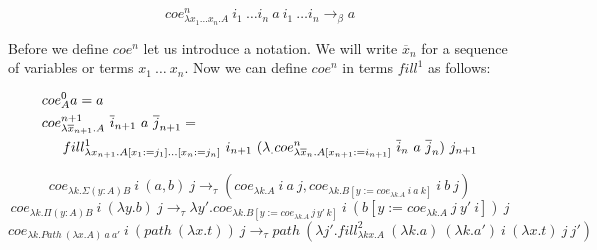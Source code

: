 \documentclass{amsart}
\theoremstyle{definition}
\theoremstyle{remark}
\numberwithin{figure}{section}
\begin{document}
\[ coe^n_{\lambda x_1 \ldots x_n. A}\ i_1\ \ldots i_n\ a\ i_1\ \ldots i_n \to_\beta a \]

Before we define $coe^n$ let us introduce a notation.
We will write $\overline{x}_n$ for a sequence of variables or terms $x_1\ \ldots\ x_n$.
Now we can define $coe^n$ in terms $fill^1$ as follows:

\begin{align*}
& coe^0_A a = a \\
& coe^{n+1}_{\lambda \overline{x}_{n+1}. A}\ \overline{i}_{n+1}\ a\ \overline{j}_{n+1} = \\
& \indent fill^1_{\lambda x_{n+1}. A[x_1 := j_1] \ldots [x_n := j_n]}\ i_{n+1}\ (\lambda _. coe^n_{\lambda \overline{x}_n. A[x_{n+1} := i_{n+1}]}\ \overline{i}_n\ a\ \overline{j}_n)\ j_{n+1}
\end{align*}

\begin{comment}
\begin{align*}
& fill^1_{\lambda x_1. A}\ i\ a_1\ j_1 = coe_{\lambda x_1. A}\ i\ a_1\ j_1 \\
& fill^{n+1}_{\lambda \overline{x}_{n+1}. A}\ (\lambda \overline{x}_n. a_{n+1})\ (\lambda \overline{x}_n. a'_{n+1}) \ldots (\lambda \overline{x}_n. a_2)\ (\lambda \overline{x}_n. a'_2)\ i\ (\lambda \overline{x}_n. a_1)\ j_1 \ldots j_{n+1} = \\
& \indent fill^n_{\lambda \overline{x}_n. Path\ (\lambda x_{n+1}. A)\ a_{n+1}\ a'_{n+1}} \\
& \indent (\lambda \overline{x}_{n-1}. path (\lambda x_n. a_n))\ (\lambda \overline{x}_{n-1}. path (\lambda x_n. a'_n)) \ldots \\
& \indent (\lambda \overline{x}_{n-1}. path (\lambda x_n. a_2))\ (\lambda \overline{x}_{n-1}. path (\lambda x_n. a'_2)) \\
& \indent i\ (\lambda \overline{x}_{n-1}. path (\lambda x_n. a_1))\ j_1 \ldots j_n\ @\ j_{n+1}
\end{align*}
\end{comment}

\[ coe_{\lambda k. \Sigma (y : A) B}\ i\ (a, b)\ j \to_\tau (coe_{\lambda k. A}\ i\ a\ j, coe_{\lambda k. B[y := coe_{\lambda k. A}\ i\ a\ k]}\ i\ b\ j) \]
\[ coe_{\lambda k. \Pi (y : A) B}\ i\ (\lambda y. b)\ j \to_\tau \lambda y'. coe_{\lambda k. B[y := coe_{\lambda k. A}\,j\,y'\,k]}\ i\ (b[y := coe_{\lambda k. A}\ j\ y'\ i])\ j \]
\[ coe_{\lambda k. Path\ (\lambda x. A)\ a\ a'}\ i\ (path\ (\lambda x. t))\ j \to_\tau path\ (\lambda j'. fill^2_{\lambda k x. A}\ (\lambda k. a)\ (\lambda k. a')\ i\ (\lambda x. t)\ j\ j') \]
\end{document}
